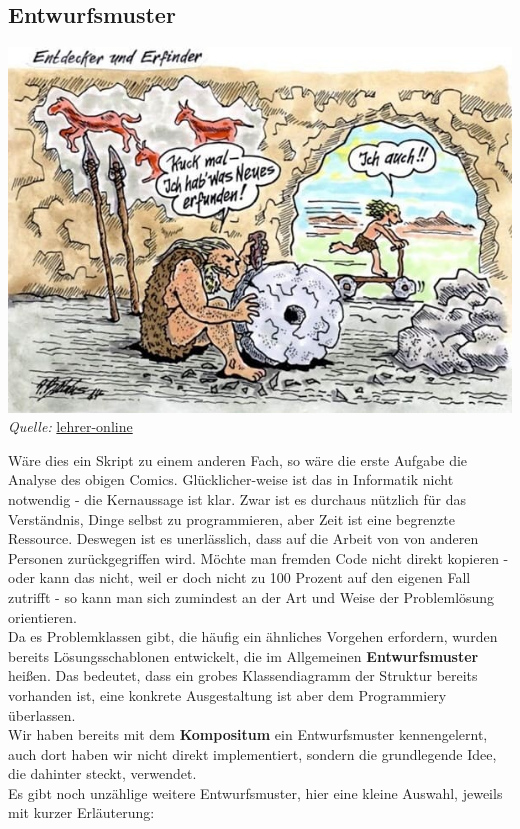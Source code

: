 \documentclass{article}
\begin{document}
\subsection{Entwurfsmuster}

\begin{center}
    \includegraphics[scale=0.5]{../../media/cartoon_rad.jpg} \\
    \textit{Quelle:} \href{https://www.lehrer-online.de/artikel/fa/cartoon-der-woche-entdecker-und-erfinder/#}{lehrer-online}
\end{center}

Wäre dies ein Skript zu einem anderen Fach, so wäre die erste Aufgabe die Analyse des obigen Comics. Glücklicher-weise ist das in Informatik nicht notwendig - die Kernaussage ist klar. Zwar ist es durchaus nützlich für das Verständnis, Dinge selbst zu programmieren, aber Zeit ist eine begrenzte Ressource. Deswegen ist es unerlässlich, dass auf die Arbeit von von anderen Personen zurückgegriffen wird. Möchte man fremden Code nicht direkt kopieren - oder kann das nicht, weil er doch nicht zu 100 Prozent auf den eigenen Fall zutrifft - so kann man sich zumindest an der Art und Weise der Problemlösung orientieren. \\
Da es Problemklassen gibt, die häufig ein ähnliches Vorgehen erfordern, wurden bereits Lösungsschablonen entwickelt, die im Allgemeinen \textbf{Entwurfsmuster} heißen. Das bedeutet, dass ein grobes Klassendiagramm der Struktur bereits vorhanden ist, eine konkrete Ausgestaltung ist aber dem Programmiery überlassen. \\
Wir haben bereits mit dem \textbf{Kompositum} ein Entwurfsmuster kennengelernt, auch dort haben wir nicht direkt  implementiert, sondern die grundlegende Idee, die dahinter steckt, verwendet. \\
Es gibt noch unzählige weitere Entwurfsmuster, hier eine kleine Auswahl, jeweils mit kurzer Erläuterung:
\end{document}
